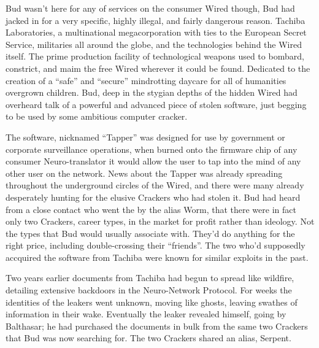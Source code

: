 \documentclass{book}
\begin{document}
Bud wasn't here for any of services on the consumer Wired though, Bud had jacked in for a very specific, highly illegal, and fairly dangerous reason. Tachiba Laboratories, a multinational megacorporation with ties to the European Secret Service, militaries all around the globe, and the technologies behind the Wired itself. The prime production facility of technological weapons used to bombard, constrict, and maim the free Wired wherever it could be found. Dedicated to the creation of a ``safe'' and ``secure'' mindrotting daycare for all of humanities overgrown children. Bud, deep in the stygian depths of the hidden Wired had overheard talk of a powerful and advanced piece of stolen software, just begging to be used by some ambitious computer cracker.

The software, nicknamed ``Tapper'' was designed for use by government or corporate surveillance operations, when burned onto the firmware chip of any consumer Neuro-translator it would allow the user to tap into the mind of any other user on the network. News about the Tapper was already spreading throughout the underground circles of the Wired, and there were many already desperately hunting for the elusive Crackers who had stolen it. Bud had heard from a close contact who went the by the alias Worm, that there were in fact only two Crackers, career types, in the market for profit rather than ideology. Not the types that Bud would usually associate with. They'd do anything for the right price, including double-crossing their ``friends''. The two who'd supposedly accquired the software from Tachiba were known for similar exploits in the past.

Two years earlier documents from Tachiba had begun to spread like wildfire, detailing extensive backdoors in the Neuro-Network Protocol. For weeks the identities of the leakers went unknown, moving like ghosts, leaving swathes of information in their wake. Eventually the leaker revealed himself, going by Balthasar; he had purchased the documents in bulk from the same two Crackers that Bud was now searching for. The two Crackers shared an alias, Serpent.
\end{document}
